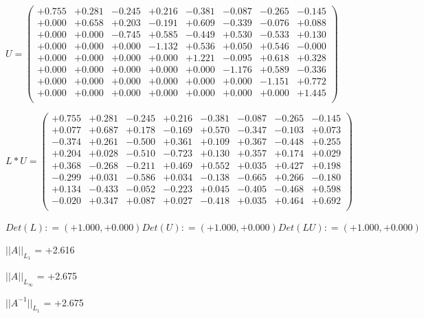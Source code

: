 \documentclass[9pt]{article}
\theoremstyle{plain}
\theoremstyle{definition}
\theoremstyle{remark}
\numberwithin{equation}{section}
\begin{document}
$U = \left(
\begin{array}{
cccccccc}
+0.755 & +0.281 & -0.245 & +0.216 & -0.381 & -0.087 & -0.265 & -0.145 \\
+0.000 & +0.658 & +0.203 & -0.191 & +0.609 & -0.339 & -0.076 & +0.088 \\
+0.000 & +0.000 & -0.745 & +0.585 & -0.449 & +0.530 & -0.533 & +0.130 \\
+0.000 & +0.000 & +0.000 & -1.132 & +0.536 & +0.050 & +0.546 & -0.000 \\
+0.000 & +0.000 & +0.000 & +0.000 & +1.221 & -0.095 & +0.618 & +0.328 \\
+0.000 & +0.000 & +0.000 & +0.000 & +0.000 & -1.176 & +0.589 & -0.336 \\
+0.000 & +0.000 & +0.000 & +0.000 & +0.000 & +0.000 & -1.151 & +0.772 \\
+0.000 & +0.000 & +0.000 & +0.000 & +0.000 & +0.000 & +0.000 & +1.445 \\
\end{array}
\right)$ \newline 

$L * U  = \left(
\begin{array}{
cccccccc}
+0.755 & +0.281 & -0.245 & +0.216 & -0.381 & -0.087 & -0.265 & -0.145 \\
+0.077 & +0.687 & +0.178 & -0.169 & +0.570 & -0.347 & -0.103 & +0.073 \\
-0.374 & +0.261 & -0.500 & +0.361 & +0.109 & +0.367 & -0.448 & +0.255 \\
+0.204 & +0.028 & -0.510 & -0.723 & +0.130 & +0.357 & +0.174 & +0.029 \\
+0.368 & -0.268 & -0.211 & +0.469 & +0.552 & +0.035 & +0.427 & +0.198 \\
-0.299 & +0.031 & -0.586 & +0.034 & -0.138 & -0.665 & +0.266 & -0.180 \\
+0.134 & -0.433 & -0.052 & -0.223 & +0.045 & -0.405 & -0.468 & +0.598 \\
-0.020 & +0.347 & +0.087 & +0.027 & -0.418 & +0.035 & +0.464 & +0.692 \\
\end{array}
\right)$ \newline 

$Det(L) :    = (+1.000,+0.000)     Det(U) :    = (+1.000,+0.000)     Det(LU) :    = (+1.000,+0.000)$

$||A||_{L_1}$  = +2.616

$||A||_{L_{\infty}}$ = +2.675

$||A^{-1}||_{L_1}$  = +2.675
\end{document}
